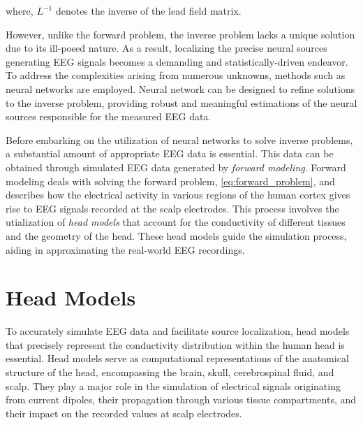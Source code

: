 \documentclass[a4paper, UKenglish, 11pt]{uiomaster}
\begin{document}
where, $L^{-1}$ denotes the inverse of the lead field matrix.

However, unlike the forward problem, the inverse problem lacks a unique solution due to its ill-posed nature. As a result, localizing the precise neural sources generating EEG signals becomes a demanding and statistically-driven endeavor. To address the complexities arising from numerous unknowns, methods such as neural networks are employed. Neural network can be designed to refine solutions to the inverse problem, providing robust and meaningful estimations of the neural sources responsible for the measured EEG data.


Before embarking on the utilization of neural networks to solve inverse problems, a substantial amount of appropriate EEG data is essential. This data can be obtained through simulated EEG data generated by \emph{forward modeling}. Forward modeling deals with solving the forward problem, \ref{eq:forward_problem}, and describes how the electrical activity in various regions of the human cortex gives rise to EEG signals recorded at the scalp electrodes. This process involves the utialization of \emph{head models} that account for the conductivity of different tissues and the geometry of the head. These head models guide the simulation process, aiding in approximating the real-world EEG recordings.


\section{Head Models}
To accurately simulate EEG data and facilitate source localization, head models that precisely represent the conductivity distribution within the human head is essential. Head models serve as computational representations of the anatomical structure of the head, encompassing the brain, skull, cerebrospinal fluid, and scalp. They play a major role in the simulation of electrical signals originating from current dipoles, their propagation through various tissue compartments, and their impact on the recorded values at scalp electrodes.
\end{document}
